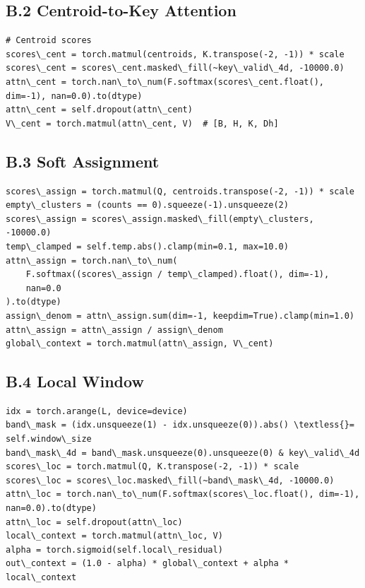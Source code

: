\subsection{B.2 Centroid-to-Key Attention}

\begin{lstlisting}
# Centroid scores
scores\_cent = torch.matmul(centroids, K.transpose(-2, -1)) * scale
scores\_cent = scores\_cent.masked\_fill(~key\_valid\_4d, -10000.0)
attn\_cent = torch.nan\_to\_num(F.softmax(scores\_cent.float(), dim=-1), nan=0.0).to(dtype)
attn\_cent = self.dropout(attn\_cent)
V\_cent = torch.matmul(attn\_cent, V)  # [B, H, K, Dh]
\end{lstlisting}

\subsection{B.3 Soft Assignment}

\begin{lstlisting}
scores\_assign = torch.matmul(Q, centroids.transpose(-2, -1)) * scale
empty\_clusters = (counts == 0).squeeze(-1).unsqueeze(2)
scores\_assign = scores\_assign.masked\_fill(empty\_clusters, -10000.0)
temp\_clamped = self.temp.abs().clamp(min=0.1, max=10.0)
attn\_assign = torch.nan\_to\_num(
    F.softmax((scores\_assign / temp\_clamped).float(), dim=-1),
    nan=0.0
).to(dtype)
assign\_denom = attn\_assign.sum(dim=-1, keepdim=True).clamp(min=1.0)
attn\_assign = attn\_assign / assign\_denom
global\_context = torch.matmul(attn\_assign, V\_cent)
\end{lstlisting}

\subsection{B.4 Local Window}

\begin{lstlisting}
idx = torch.arange(L, device=device)
band\_mask = (idx.unsqueeze(1) - idx.unsqueeze(0)).abs() \textless{}= self.window\_size
band\_mask\_4d = band\_mask.unsqueeze(0).unsqueeze(0) & key\_valid\_4d
scores\_loc = torch.matmul(Q, K.transpose(-2, -1)) * scale
scores\_loc = scores\_loc.masked\_fill(~band\_mask\_4d, -10000.0)
attn\_loc = torch.nan\_to\_num(F.softmax(scores\_loc.float(), dim=-1), nan=0.0).to(dtype)
attn\_loc = self.dropout(attn\_loc)
local\_context = torch.matmul(attn\_loc, V)
alpha = torch.sigmoid(self.local\_residual)
out\_context = (1.0 - alpha) * global\_context + alpha * local\_context
\end{lstlisting}

